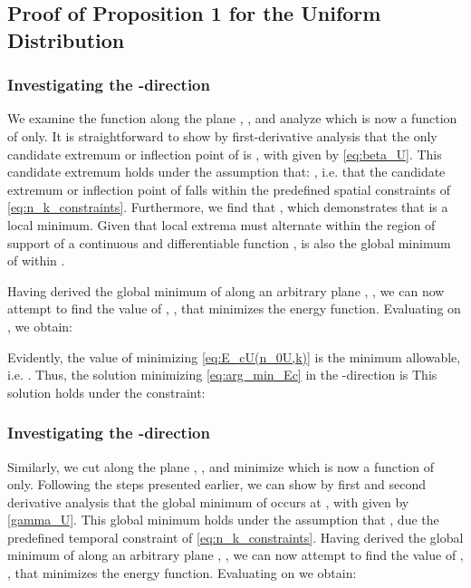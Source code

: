 \documentclass[twocolumn,english]{IEEEtran}
\theoremstyle{plain}
\theoremstyle{definition}
\begin{document}
\subsection{Proof of Proposition 1 for the Uniform Distribution\label{sub:Appendix-Uniform}}


\subsubsection{Investigating the -direction}

We examine the function  along the plane ,
, and analyze 
which is now a function of  only. It is straightforward to show
by first-derivative analysis that the only candidate extremum or inflection
point of  is ,
with  given by \ref{eq:beta_U}. This candidate
extremum holds under the assumption that: ,
i.e. that the candidate extremum or inflection point of 
falls within the predefined spatial constraints of \eqref{eq:n_k_constraints}.
Furthermore, we find that ,
which demonstrates that  is a local minimum. Given
that local extrema must alternate within the region of support of
a continuous and differentiable function \cite{hardy2008course},
 is also the global minimum of 
within .

Having derived the global minimum of 
along an arbitrary plane , ,
we can now attempt to find the value of , ,
that minimizes the energy function. Evaluating 
on , we obtain: 

Evidently, the value of  minimizing \eqref{eq:E_cU(n_0U,k)} is
the minimum allowable, i.e. . Thus, the solution
minimizing \eqref{eq:arg_min_Ec} in the -direction is 
This solution holds under the constraint:





\subsubsection{Investigating the -direction}

Similarly, we cut  along the plane ,
, and minimize
 which is now a function of  only.
Following the steps presented earlier, we can show by first and second
derivative analysis that the global minimum of 
occurs at , with
 given by \eqref{gamma_U}. This global minimum
holds under the assumption that , due
the predefined temporal constraint of \eqref{eq:n_k_constraints}.
Having derived the global minimum of 
along an arbitrary plane , ,
we can now attempt to find the value of , ,
that minimizes the energy function. Evaluating 
on  we obtain:{} 
\end{document}
